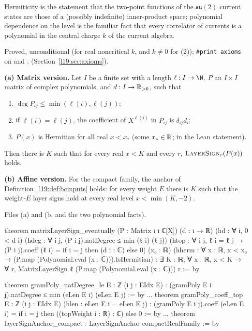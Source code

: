 \begin{physics}
Hermiticity is the statement that the two-point functions of the $\mathfrak{su}(2)$ current states are those of a
(possibly indefinite) inner-product space; polynomial dependence on the level is the familiar fact that every correlator
of currents is a polynomial in the central charge $k$ of the current algebra.
\end{physics}

\begin{status}
Proved, unconditional (for real noncritical $k$, and $k\ne0$ for (2)); \texttt{\#print axioms} on 
and :  (Section~\ref{l19:sec:axioms}).
\end{status}

\begin{theorem}\label{l19:thm:bcanchor}
\textbf{(a) Matrix version.} Let $I$ be a finite set with a length $\ell:I\to\N$, $P$ an $I\times I$ matrix of
complex polynomials, and $d:I\to\mathbb{R}_{>0}$, such that
\begin{enumerate}
\item $\deg P_{ij}\le\min(\ell(i),\ell(j))$;
\item if $\ell(i) = \ell(j)$, the coefficient of $X^{\ell(i)}$ in $P_{ij}$ is $\delta_{ij}d_i$;
\item $P(x)$ is Hermitian for all real $x<x_*$ (some $x_*\in\mathbb{R}$;  in the Lean statement).
\end{enumerate}
Then there is $K$ such that for every real $x<K$ and every $r$, $\textsc{LayerSign}_r(P(x))$ holds.

\textbf{(b) Affine version.} For the compact family, the anchor of Definition~\ref{l19:def:bcinputs} holds: for every
weight $E$ there is $K$ such that the weight-$E$ layer signs hold at every real level $x<\min(K,-2)$.
\end{theorem}

{\raggedright\noindent Files  (a) and
 (b, and the two polynomial facts).\par}
\begin{leancode}
theorem matrixLayerSign_eventually (P : Matrix ι ι ℂ[X]) (d : ι → ℝ) (hd : ∀ i, 0 < d i)
    (hdeg : ∀ i j, (P i j).natDegree ≤ min (ℓ i) (ℓ j))
    (htop : ∀ i j, ℓ i = ℓ j → (P i j).coeff (ℓ i) = if i = j then (d i : ℂ) else 0)
    (x₀ : ℝ) (hherm : ∀ x : ℝ, x < x₀ → (P.map (Polynomial.eval (x : ℂ))).IsHermitian) :
    ∃ K : ℝ, ∀ x : ℝ, x < K → ∀ r, MatrixLayerSign ℓ (P.map (Polynomial.eval (x : ℂ))) r := by

theorem gramPoly_natDegree_le {E : ℤ} (i j : EIdx E) :
    (gramPoly E i j).natDegree ≤ min (eLen E i) (eLen E j) := by
...
theorem gramPoly_coeff_top {E : ℤ} (i j : EIdx E) (hlen : eLen E i = eLen E j) :
    (gramPoly E i j).coeff (eLen E i) = if i = j then ((topWeight i : ℝ) : ℂ) else 0 := by
...
theorem layerSignAnchor_compact : LayerSignAnchor compactRealFamily := by
\end{leancode}

